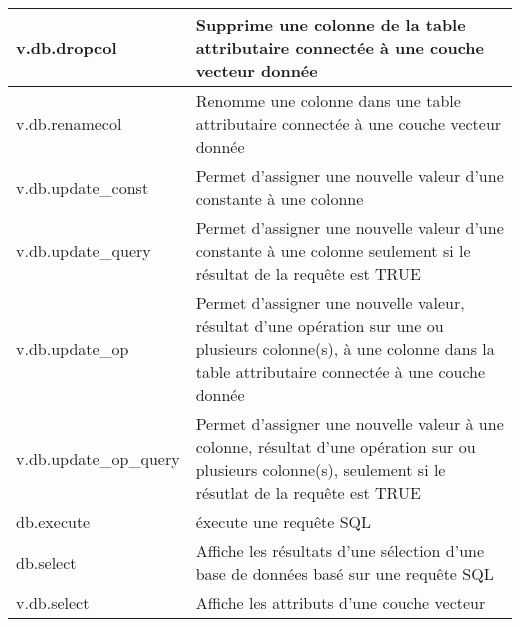 \begin{center}
{\begin{longtable}{|p{4cm}|p{10cm}|}
  \hline v.db.dropcol & Supprime une colonne de la table attributaire connectée à une couche vecteur donnée\\
  \hline v.db.renamecol & Renomme une colonne dans une table attributaire connectée à une couche vecteur donnée\\
  \hline v.db.update\_const & Permet d'assigner une nouvelle valeur d'une constante à une colonne\\
  \hline v.db.update\_query & Permet d'assigner une nouvelle valeur d'une constante à une colonne seulement si le résultat de la requ\^ete est TRUE\\
  \hline v.db.update\_op & Permet d'assigner une nouvelle valeur, résultat d'une opération sur une ou plusieurs colonne(s), à une colonne dans la table attributaire connectée à une couche donnée\\
  \hline v.db.update\_op\_query & Permet d'assigner une nouvelle valeur à une colonne, résultat d'une opération sur ou plusieurs colonne(s), seulement si le résutlat de la requ\^ete est TRUE \\
  \hline db.execute & éxecute une requ\^ete SQL\\
  \hline db.select & Affiche les résultats d'une sélection d'une base de données basé sur une requ\^ete SQL\\
  \hline v.db.select & Affiche les attributs d'une couche vecteur\\

\end{longtable}}
\end{center}
